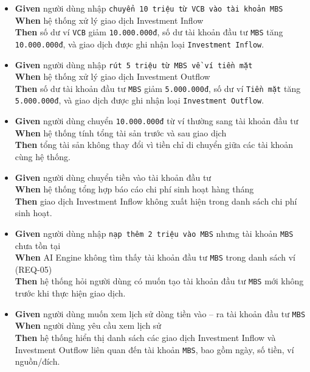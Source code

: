 \begin{itemize}
\item \textbf{Given} người dùng nhập \texttt{chuyển 10 triệu từ VCB vào tài khoản MBS}  \\ \hspace*{1.5em}  \textbf{When} hệ thống xử lý giao dịch Investment Inflow  \\ \hspace*{1.5em}  \textbf{Then} số dư ví \texttt{VCB} giảm \texttt{10.000.000đ}, số dư tài khoản đầu tư \texttt{MBS} tăng \texttt{10.000.000đ}, và giao dịch được ghi nhận loại \texttt{Investment Inflow}.
\item \textbf{Given} người dùng nhập \texttt{rút 5 triệu từ MBS về ví tiền mặt}  \\ \hspace*{1.5em}  \textbf{When} hệ thống xử lý giao dịch Investment Outflow  \\ \hspace*{1.5em}  \textbf{Then} số dư tài khoản đầu tư \texttt{MBS} giảm \texttt{5.000.000đ}, số dư ví \texttt{Tiền mặt} tăng \texttt{5.000.000đ}, và giao dịch được ghi nhận loại \texttt{Investment Outflow}.
\item \textbf{Given} người dùng chuyển \texttt{10.000.000đ} từ ví thường sang tài khoản đầu tư  \\ \hspace*{1.5em}  \textbf{When} hệ thống tính tổng tài sản trước và sau giao dịch  \\ \hspace*{1.5em}  \textbf{Then} tổng tài sản không thay đổi vì tiền chỉ di chuyển giữa các tài khoản cùng hệ thống.
\item \textbf{Given} người dùng chuyển tiền vào tài khoản đầu tư  \\ \hspace*{1.5em}  \textbf{When} hệ thống tổng hợp báo cáo chi phí sinh hoạt hàng tháng  \\ \hspace*{1.5em}  \textbf{Then} giao dịch Investment Inflow không xuất hiện trong danh sách chi phí sinh hoạt.
\item \textbf{Given} người dùng nhập \texttt{nạp thêm 2 triệu vào MBS} nhưng tài khoản \texttt{MBS} chưa tồn tại  \\ \hspace*{1.5em}  \textbf{When} AI Engine không tìm thấy tài khoản đầu tư \texttt{MBS} trong danh sách ví (REQ-05)  \\ \hspace*{1.5em}  \textbf{Then} hệ thống hỏi người dùng có muốn tạo tài khoản đầu tư \texttt{MBS} mới không trước khi thực hiện giao dịch.
\item \textbf{Given} người dùng muốn xem lịch sử dòng tiền vào – ra tài khoản đầu tư \texttt{MBS}  \\ \hspace*{1.5em}  \textbf{When} người dùng yêu cầu xem lịch sử  \\ \hspace*{1.5em}  \textbf{Then} hệ thống hiển thị danh sách các giao dịch Investment Inflow và Investment Outflow liên quan đến tài khoản \texttt{MBS}, bao gồm ngày, số tiền, ví nguồn/đích.
\end{itemize}
